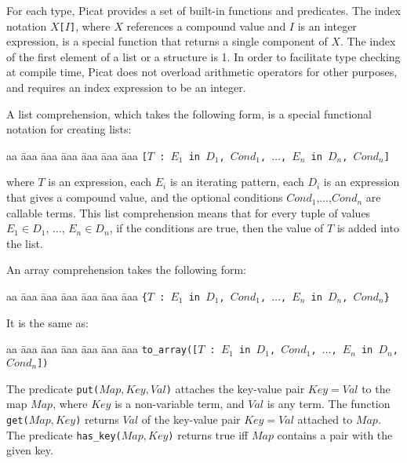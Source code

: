 For each type, Picat provides a set of built-in functions and predicates. The index notation \texttt{$X$[$I$]}, where $X$ references a compound value and $I$ is an integer expression, is a special function that returns a single component of $X$. The index of the first element of a list or a structure is 1. In order to facilitate type checking at compile time, Picat does not overload arithmetic operators for other purposes, and requires an index expression to be an integer.

A list comprehension, which takes the following form, is a special functional notation for creating lists:
\begin{tabbing}
aa \= aaa \= aaa \= aaa \= aaa \= aaa \= aaa \kill
\> \> \texttt{[$T$ : $E_1$ \texttt{in} $D_1$, $Cond_1$, $\ldots$, $E_n$ in $D_n$, $Cond_n$]} 
\end{tabbing}
where $T$ is an expression, each $E_i$ is an iterating pattern, each $D_i$ is an expression that gives a compound value, and the optional conditions $Cond_1$,$\ldots$,$Cond_n$  are callable terms. This list comprehension means that for every tuple of values $E_1 \in D_1$, $\ldots$, $E_n \in D_n$, if the conditions are true, then the value of $T$ is added into the list.

An array comprehension takes the following form:
\begin{tabbing}
aa \= aaa \= aaa \= aaa \= aaa \= aaa \= aaa \kill
\> \> \texttt{\{$T$ : $E_1$ \texttt{in} $D_1$, $Cond_1$, $\ldots$, $E_n$ in $D_n$, $Cond_n$\}} 
\end{tabbing}
It is the same as:
\begin{tabbing}
aa \= aaa \= aaa \= aaa \= aaa \= aaa \= aaa \kill
\> \> \texttt{to\_array([$T$ : $E_1$ \texttt{in} $D_1$, $Cond_1$, $\ldots$, $E_n$ in $D_n$, $Cond_n$])} 
\end{tabbing}

The predicate \texttt{put($Map,Key,Val$)} attaches the key-value pair \texttt{$Key$$=$$Val$} to the map \texttt{$Map$}, where \texttt{$Key$} is a non-variable term, and \texttt{$Val$} is any term. The function \texttt{get($Map,Key$)} returns \texttt{$Val$} of the key-value pair \texttt{$Key$$=$$Val$} attached to \texttt{$Map$}. The predicate \texttt{has\_key($Map,Key$)} returns true iff $Map$ contains a pair with the given key.

